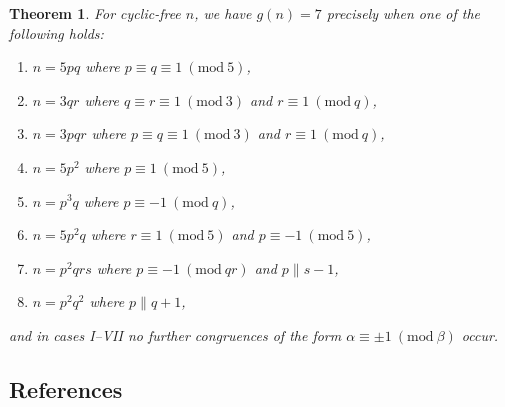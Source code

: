 \documentclass{article}
\newcommand{\Mod}[1]{\ (\mathrm{mod} \ #1)}
\theoremstyle{plain}
\newtheorem{thm}{Theorem}[section]
\theoremstyle{definition}
\begin{document}
\begin{thm}
	For cyclic-free $n$, we have $g(n) = 7$ precisely when one of the following holds:
	\begin{enumerate}	\listspace
		\item $n = 5pq$ where $p \equiv q \equiv 1 \Mod{5}$,
		\item $n = 3qr$ where $q \equiv r \equiv 1 \Mod{3}$ and $r \equiv 1 \Mod{q}$,
		\item $n = 3pqr$ where $p \equiv q \equiv 1 \Mod{3}$ and $r \equiv 1 \Mod{q}$,
		\item $n = 5p^2$ where $p \equiv 1 \Mod{5}$,
		\item $n = p^3 q$ where $p \equiv -1 \Mod{q}$,
		\item $n = 5p^2 q$ where $r \equiv 1 \Mod{5}$ and $p \equiv -1 \Mod{5}$,
		\item $n = p^2 q r s$ where $p \equiv -1 \Mod{qr}$ and $p \parallel s - 1$,
		\item $n = p^2 q^2$ where $p \parallel q + 1$,
	\end{enumerate} \textspace
	and in cases I--VII no further congruences of the form $\alpha \equiv \pm 1 \Mod{\beta}$ \nolinebreak[4] \mbox{occur}.
\end{thm}

\begin{center}\section*{References}\end{center}
\printbibliography[heading=none]
\end{document}
